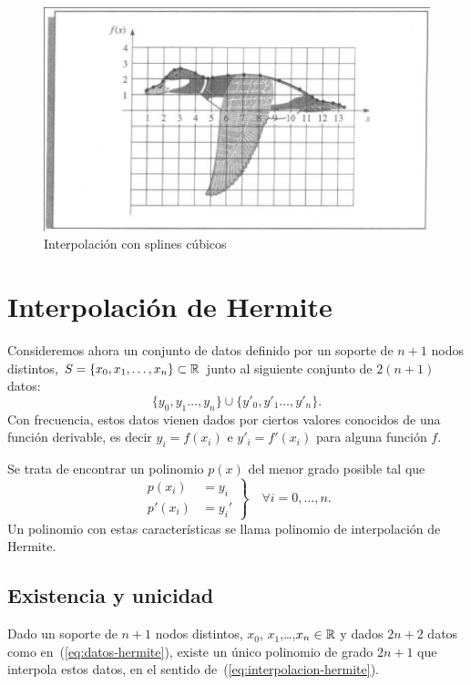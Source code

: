  \begin{figure}
   \centering
   \includegraphics[width=0.75\linewidth]{tema2/pato-spline}
   \caption{Interpolación con splines cúbicos}
   \label{fig:pato-spline}
 \end{figure}


 \section{Interpolación de Hermite}
 \label{sec:interp-de-hermite}

 Consideremos ahora un conjunto de datos definido por un soporte de
 $n+1$ nodos distintos, $S=\{x_0,x_1,\dots,x_n\}\subset \operatorname{{\mathbb R}}$ junto al
 siguiente conjunto de $2(n+1)$ datos: 
 \begin{equation}
   \{y_0,y_1\dots,y_n\} \cup \{y'_0,y'_1\dots,y'_n\}. 
   \label{eq:datos-hermite}
 \end{equation}
 Con frecuencia, estos datos vienen dados por ciertos valores conocidos
 de una función derivable, es decir  $y_i=f(x_i)$ e
 $y'_i=f'(x_i)$ para alguna función $f$.

 Se trata de encontrar un polinomio $p(x)$ del menor grado posible tal
 que 
 \begin{equation}
   \left.
     \begin{aligned}
       p(x_i) &= y_i \\ p'(x_i)&=y_i'
     \end{aligned}
   \right\}\quad \forall i=0,\dots,n.
   \label{eq:interpolacion-hermite}
 \end{equation}
 Un polinomio con estas características se llama polinomio de
 interpolación de Hermite.

 \subsection{Existencia y unicidad}
 \label{sec:exist-y-unic}

 \begin{theorem}
   Dado un soporte de $n+1$ nodos distintos, $x_0$,
   $x_1$,\dots,$x_n\in\operatorname{{\mathbb R}}$ y dados $2n+2$ datos como
   en~(\ref{eq:datos-hermite}), existe un único polinomio de grado
   $2n+1$ que interpola estos datos, en el sentido
   de~(\ref{eq:interpolacion-hermite}).
 \end{theorem}

